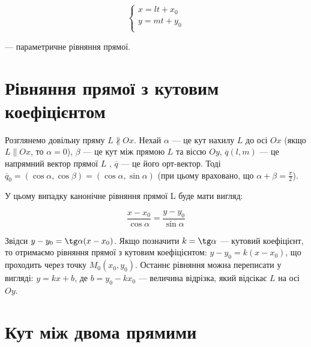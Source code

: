$$\left\{\begin{array}{l}
	x = lt + x_0 \\
	y = mt + y_0 \\
\end{array}\right.$$

--- параметричне рівняння прямої.

\section{Рівняння прямої з кутовим коефіцієнтом}

\parbox{110px}{}
\parbox{8.6cm}{
	Розглянемо довільну пряму $L \nparallel Ox$. Нехай $\alpha$ --- це кут нахилу $L$
	до осі $Ox$ (якщо $L \parallel Ox$, то $\alpha = 0$), $\beta$ --- це кут між прямою $L$
	та віссю $Oy$, $\overline{q}(l,m)$ --- це напрямний вектор прямої $L$ , $\overline{q}$ ---
	це його орт-вектор. Тоді $\overline{q}_0 = (\cos \alpha, \cos \beta) = (\cos \alpha, \sin \alpha)$ (при
	цьому враховано, що $\alpha + \beta = \frac{\pi}{2}$). 
}

У цьому випадку канонічне рівняння прямої L буде мати вигляд:

$$\dfrac{x - x_0}{\cos\alpha} = \dfrac{y - y_0}{\sin\alpha}$$

Звідси $y - y_0 = \tg\alpha(x - x_0)$. Якщо позначити $k = \tg\alpha$ --- кутовий коефіцієнт,
то отримаємо рівняння прямої з кутовим коефіцієнтом:
$y - y_0 = k(x - x_0)$,
що проходить через точку $M_0(x_0, y_0)$.
Останнє рівняння можна переписати у вигляді:
$y = kx + b$,
де $b = y_0 - kx_0$ --- величина відрізка, який відсікає $L$ на осі $Oy$. 

\section{Кут між двома прямими}

